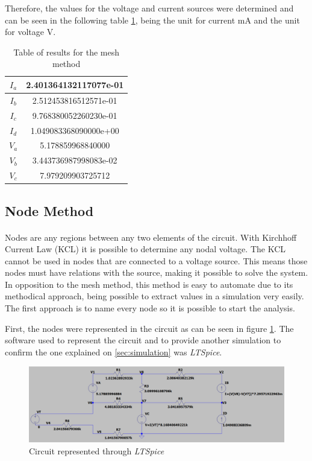 \par Therefore, the values for the voltage and current sources were determined and can be seen in the following table \ref{results mesh}, being the unit for current mA and the unit for voltage V. 

\begin{table}[H]
    \centering
    \begin{tabular}{|c|c|}
    \hline
        $I_a$ & 2.401364132117077e-01 \\ \hline 
        $I_b$ & 2.512453816512571e-01 \\ \hline
        $I_c$ & 9.768380052260230e-01 \\ \hline
        $I_d$ & 1.049083368090000e+00 \\ \hline
        $V_a$ & 5.178859968840000 \\ \hline
        $V_b$ & 3.443736987998083e-02 \\ \hline
        $V_c$ & 7.979209903725712\\ \hline
    \end{tabular}
    \caption{Table of results for the mesh method}
    \label{results mesh}
\end{table}

\subsection{Node Method}
\paragraph{}
\par Nodes are any regions between any two elements of the circuit. With Kirchhoff Current Law (KCL) it is possible to determine any nodal voltage. The KCL cannot be used in nodes that are connected to a voltage source. This means those nodes must have relations with the source, making it possible to solve the system. In opposition to the mesh method, this method is easy to automate due to its methodical approach, being possible to extract values in a simulation very easily.
The first approach is to name every node so it is possible to start the analysis.


\par First, the nodes were represented in the circuit as can be seen in figure \ref{circuitlt}. The software used to represent the circuit and to provide another simulation to confirm the one explained on \ref{sec:simulation} was \textit{LTSpice}.

\begin{figure}[H]
    \includegraphics[width=0.8\linewidth]{CircuitLTSpice.png}
    \centering
    \caption{Circuit represented through \textit{LTSpice}}
    \label{circuitlt}
\end{figure}


